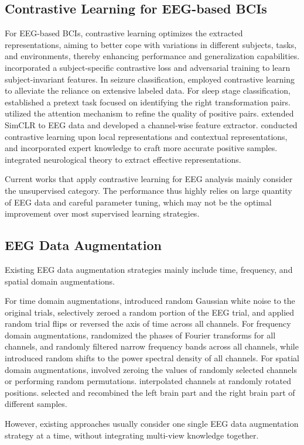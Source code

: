 \subsection{Contrastive Learning for EEG-based BCIs}
For EEG-based BCIs, contrastive learning optimizes the extracted representations, aiming to better cope with variations in different subjects, tasks, and environments, thereby enhancing performance and generalization capabilities. \cite{cheng2020subject} incorporated a subject-specific contrastive loss and adversarial training to learn subject-invariant features. In seizure classification,  \cite{huang2023epilepsynet} employed contrastive learning to alleviate the reliance on extensive labeled data. For sleep stage classification,  \cite{jiang2021self} established a pretext task focused on identifying the right transformation pairs. \cite{lee2022self} utilized the attention mechanism to refine the quality of positive pairs. \cite{Mohsenvand2020} extended SimCLR to EEG data and developed a channel-wise feature extractor. \cite{zhang2022expert} conducted contrastive learning upon local representations and contextual representations, and incorporated expert knowledge to craft more accurate positive samples.  \cite{weng2023knowledge} integrated neurological theory to extract effective representations.

Current works that apply contrastive learning for EEG analysis mainly consider the unsupervised category. The performance thus highly relies on large quantity of EEG data and careful parameter tuning, which may not be the optimal improvement over most supervised learning strategies.

\subsection{EEG Data Augmentation} 
Existing EEG data augmentation strategies mainly include time, frequency, and spatial domain augmentations.

For time domain augmentations, \cite{Wang2018} introduced random Gaussian white noise to the original trials, \cite{Mohsenvand2020} selectively zeroed a random portion of the EEG trial, and \cite{Rommel2021} applied random trial flips or reversed the axis of time across all channels. For frequency domain augmentations, \cite{Schwabedal2018surr} randomized the phases of Fourier transforms for all channels, \cite{Mohsenvand2020} and \cite{cheng2020subject} randomly filtered narrow frequency bands across all channels, while \cite{Rommel2021} introduced random shifts to the power spectral density of all channels. For spatial domain augmentations, \cite{Saeed2021} involved zeroing the values of randomly selected channels or performing random permutations. \cite{Krell2017} interpolated channels at randomly rotated positions. \cite{pei2021hs} selected and recombined the left brain part and the right brain part of different samples.

However, existing approaches usually consider one single EEG data augmentation strategy at a time, without integrating multi-view knowledge together.
